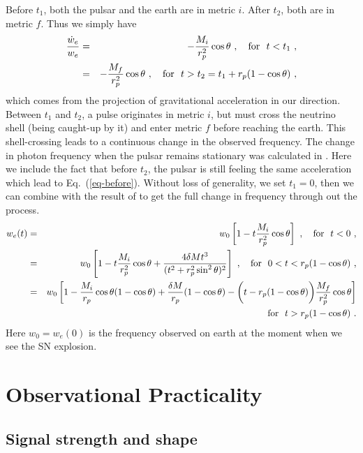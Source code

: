 \documentclass[aps,showpacs,onecolumn,floats,prd,superscriptaddress,nofootinbib]{revtex4}
\begin{document}
Before $t_1$, both the pulsar and the earth are in metric $i$. After $t_2$, both are in metric $f$. Thus we simply have
\begin{eqnarray}
\frac{\dot{w}_e}{w_e} &=& -\frac{M_i}{r_p^2}\cos\theta~, \ \ \ {\rm for} \ \ t<t_1~,
\label{eq-before} \\ \nonumber
&=& -\frac{M_f}{r_p^2}\cos\theta~, \ \ \ {\rm for} \ \ t>t_2 = t_1 + r_p(1-\cos\theta)~,
\end{eqnarray}
which comes from the projection of gravitational acceleration in our direction. Between $t_1$ and $t_2$, a pulse originates in metric $i$, but must cross the neutrino shell (being caught-up by it) and enter metric $f$ before reaching the earth. This shell-crossing leads to a continuous change in the observed frequency. The change in photon frequency when the pulsar remains stationary was calculated in \cite{OluPie13}. Here we include the fact that before $t_2$, the pulsar is still feeling the same acceleration which lead to Eq.~(\ref{eq-before}). Without loss of generality, we set $t_1=0$, then we can combine with the result of \cite{OluPie13} to get the full change in frequency through out the process.
\begin{eqnarray}
w_e(t) &=& w_0 \left[ 1 -  t\frac{M_i}{r_p^2}\cos\theta \right]~, 
\ \ \ {\rm for} \ \ t < 0~, \label{eq-beforeW}  \\ \nonumber
&=& w_0
\left[ 1 -  t\frac{M_i}{r_p^2}\cos\theta + \frac{4\delta M t^3}{(t^2 + r_p^2\sin^2\theta)^2} \right]~, 
\ \ \ {\rm for} \ \ 0 < t <  r_p(1 - \cos\theta)~, \\ \nonumber
&=& w_0
\left[ 1-\frac{M_i}{r_p}\cos\theta(1-\cos\theta) + \frac{\delta M}{r_p}(1-\cos\theta) -  \bigg(t-r_p(1-\cos\theta)\bigg) \frac{M_f}{r_p^2}\cos\theta \right]  \\ \nonumber
& & {\rm for} \ \ t > r_p(1-\cos\theta)~.
\end{eqnarray}
Here $w_0 = w_e(0)$ is the frequency observed on earth at the moment when we see the SN explosion. 

\section{Observational Practicality}
\label{sec-obs}

\subsection{Signal strength and shape}
\end{document}
